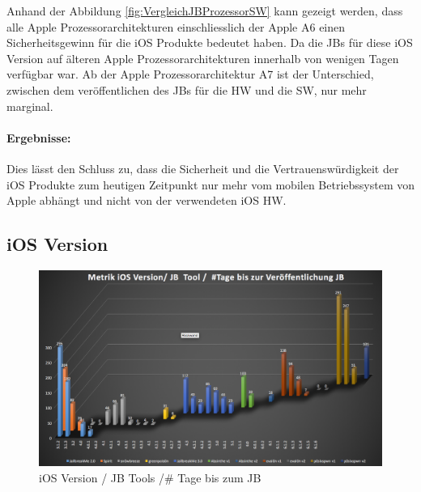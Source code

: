 Anhand der Abbildung \ref{fig:VergleichJBProzessorSW} kann gezeigt werden, dass alle Apple Prozessorarchitekturen einschliesslich der Apple A6 einen Sicherheitsgewinn für die iOS Produkte bedeutet haben. Da die JBs für diese iOS Version auf älteren Apple Prozessorarchitekturen innerhalb von wenigen Tagen verfügbar war. Ab der Apple Prozessorarchitektur A7 ist der Unterschied, zwischen dem veröffentlichen des JBs für die HW und die SW, nur mehr marginal. \par
\paragraph{Ergebnisse:} Dies lässt den Schluss zu, dass die Sicherheit und die Vertrauenswürdigkeit der iOS Produkte zum heutigen Zeitpunkt nur mehr vom mobilen Betriebssystem von Apple abhängt und nicht von der verwendeten iOS HW.

\newpage
\subsection{iOS Version}
\label{sec:Frage1iOSVersion} 

\begin{figure}[htbp]
        \centering
                \includegraphics[scale=0.41]{Bilder/Frage1_1.png}
        \caption{iOS Version / JB Tools /\# Tage bis zum JB}
        \label{fig:AnalyseiOSJB1}        
\end{figure}

